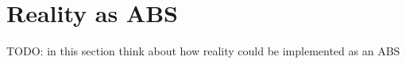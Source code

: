 \section{Reality as ABS}
TODO: in this section think about how reality could be implemented as an ABS
